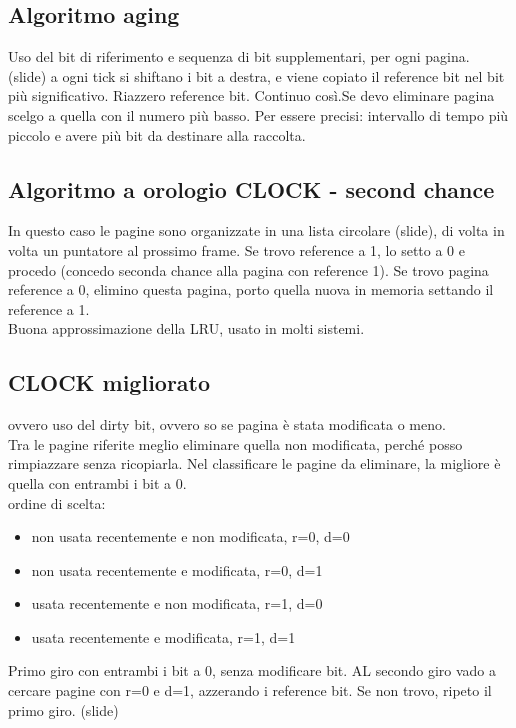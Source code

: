 \documentclass{article}
\begin{document}
\subsection{Algoritmo aging}
Uso del bit di riferimento e sequenza di bit supplementari, per ogni pagina. (slide) a ogni tick si shiftano i bit a destra, 
e viene copiato il reference bit nel bit più significativo. Riazzero reference bit. Continuo così.Se devo eliminare pagina 
scelgo a quella con il numero più basso. Per essere precisi: intervallo di tempo più piccolo e avere più bit da destinare alla raccolta.\\
\subsection{Algoritmo a orologio CLOCK - second chance}
In questo caso le pagine sono organizzate in una lista circolare (slide), di volta in volta un puntatore al prossimo frame.
Se trovo reference a 1, lo setto a 0 e procedo (concedo seconda chance alla pagina con reference 1). Se trovo pagina reference a 0, 
elimino questa pagina, porto quella nuova in memoria settando il reference a 1.\\
Buona approssimazione della LRU, usato in molti sistemi.\\
\subsection{CLOCK migliorato}
ovvero uso del dirty bit, ovvero so se pagina è stata modificata o meno.\\ 
Tra le pagine riferite meglio eliminare quella non modificata, perché posso rimpiazzare senza ricopiarla. Nel classificare 
le pagine da eliminare, la migliore è quella con entrambi i bit a 0.\\
ordine di scelta:
\begin{itemize}
    \item non usata recentemente e non modificata, r=0, d=0
    \item non usata recentemente e modificata, r=0, d=1
    \item usata recentemente e non modificata, r=1, d=0
    \item usata recentemente e modificata, r=1, d=1
\end{itemize}
Primo giro con entrambi i bit a 0, senza modificare bit. AL secondo giro vado a cercare pagine con r=0 e d=1, azzerando i reference bit. 
Se non trovo, ripeto il primo giro. (slide)\\
\end{document}
